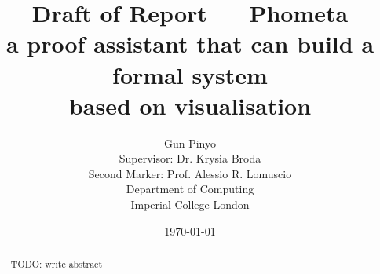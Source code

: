 \documentclass[11pt, a4paper]{report}
\title{
    Draft of Report --- Phometa \\
    a proof assistant that can build a formal system \\
    based on visualisation
}
\author{
    Gun Pinyo \\
    Supervisor: Dr. Krysia Broda\\
    Second Marker: Prof. Alessio R. Lomuscio\\
    Department of Computing \\
    Imperial College London
}
\date{\today}
\begin{document}
\maketitle
\thispagestyle{empty}

\begin{abstract}
TODO: write abstract
\end{abstract}

\tableofcontents

% 

% 
% 
% 
% 
% 
% 
% 
% 


\printbibliography\
\end{document}
